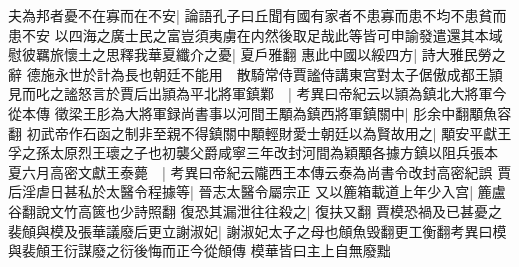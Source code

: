夫為邦者憂不在寡而在不安|{
	論語孔子曰丘聞有國有家者不患寡而患不均不患貧而患不安}
以四海之廣士民之富豈須夷虜在内然後取足哉此等皆可申諭發遣還其本域慰彼羈旅懷土之思釋我華夏纖介之憂|{
	夏戶雅翻}
惠此中國以綏四方|{
	詩大雅民勞之辭}
德施永世於計為長也朝廷不能用　散騎常侍賈謐侍講東宫對太子倨傲成都王頴見而叱之謐怒言於賈后出頴為平北將軍鎮鄴　|{
	考異曰帝紀云以頴為鎮北大將軍今從本傳}
徵梁王肜為大將軍録尚書事以河間王顒為鎮西將軍鎮關中|{
	肜余中翻顒魚容翻}
初武帝作石函之制非至親不得鎮關中顒輕財愛士朝廷以為賢故用之|{
	顒安平獻王孚之孫太原烈王瓌之子也初襲父爵咸寧三年改封河間為穎顒各據方鎮以阻兵張本}
夏六月高密文獻王泰薨　|{
	考異曰帝紀云隴西王本傳云泰為尚書令改封高密紀誤}
賈后淫虐日甚私於太醫令程據等|{
	晉志太醫令屬宗正}
又以簏箱載道上年少入宫|{
	簏盧谷翻說文竹高篋也少詩照翻}
復恐其漏泄往往殺之|{
	復扶又翻}
賈模恐禍及已甚憂之裴頠與模及張華議廢后更立謝淑妃|{
	謝淑妃太子之母也頠魚毁翻更工衡翻考異曰模與裴頠王衍謀廢之衍後悔而正今從頠傳}
模華皆曰主上自無廢黜

